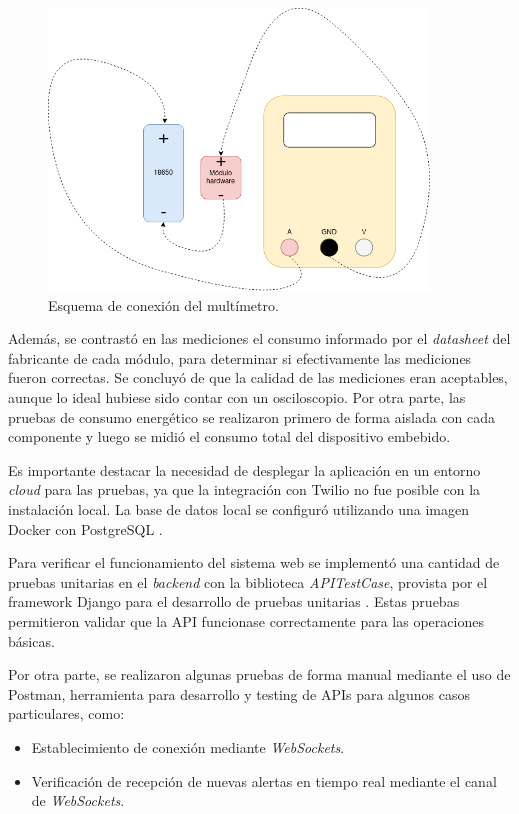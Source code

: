 \begin{figure}[H]
	\centering
	\includegraphics[width=0.9\textwidth]{./Figures/multimetro.png}
	\caption{Esquema de conexión del multímetro.}
	\label{fig:pruebas:multimetro}
\end{figure}

Además, se contrastó en las mediciones el consumo informado por el \textit{datasheet} del fabricante de cada módulo, para determinar si efectivamente las mediciones fueron correctas. Se concluyó de que la calidad de las mediciones eran aceptables, aunque lo ideal hubiese sido contar con un osciloscopio. Por otra parte, las pruebas de consumo energético se realizaron primero de forma aislada con cada componente y luego se midió el consumo total del dispositivo embebido. 

Es importante destacar la necesidad de desplegar la aplicación en un entorno \textit{cloud} para las pruebas, ya que la integración con Twilio no fue posible con la instalación local. La base de datos local se configuró utilizando una imagen Docker con PostgreSQL \citep{DOCKER:2}.

Para verificar el funcionamiento del sistema web se implementó una cantidad de pruebas unitarias en el \textit{backend} con la biblioteca \textit{APITestCase}, provista por el framework Django para el desarrollo de pruebas unitarias \citep{DJANGO:13}. Estas pruebas permitieron validar que la API funcionase correctamente para las operaciones básicas.

Por otra parte, se realizaron algunas pruebas de forma manual mediante el uso de Postman, herramienta para desarrollo y testing de APIs para algunos casos particulares, como:
\begin{itemize}
	\item Establecimiento de conexión mediante \textit{WebSockets}.
	\item Verificación de recepción de nuevas alertas en tiempo real mediante el canal de \textit{WebSockets}.
\end{itemize}

